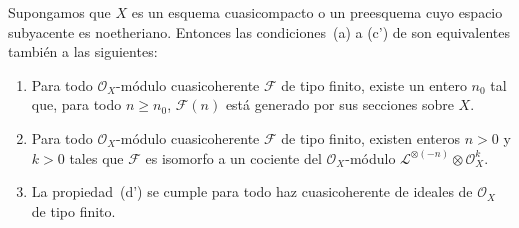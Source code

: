 \documentclass[oneside,10pt]{amsart}
\renewcommand{\geq}{\geqslant}
\let\EGAOriginalLabel\label
\renewcommand{\label}[1]{\phantomsection\EGAOriginalLabel{#1}}
\begin{document}
\begin{proposition}[4.5.5]
\label{II.4.5.5-fr}
Supongamos que $X$ es un esquema cuasicompacto o un preesquema cuyo espacio subyacente es noetheriano.
Entonces las condiciones~\textup{(a)} a \textup{(c')} de  son equivalentes también a las siguientes:
\begin{enumerate}
  \item[\rm{(d)}] Para todo $\mathcal{O}_X$-módulo cuasicoherente $\mathcal{F}$ de tipo finito, existe un entero $n_0$ tal que, para todo $n\geq n_0$, $\mathcal{F}(n)$ está generado por sus secciones sobre $X$.
  \item[\rm{(d')}] Para todo $\mathcal{O}_X$-módulo cuasicoherente $\mathcal{F}$ de tipo finito, existen enteros $n>0$ y $k>0$ tales que $\mathcal{F}$ es isomorfo a un cociente del $\mathcal{O}_X$-módulo $\mathcal{L}^{\otimes(-n)}\otimes\mathcal{O}_X^k$.
  \item[\rm{(d'')}] La propiedad~\textup{(d')} se cumple para todo haz cuasicoherente de ideales de $\mathcal{O}_X$ de tipo finito.
\end{enumerate}
\end{proposition}
\end{document}
